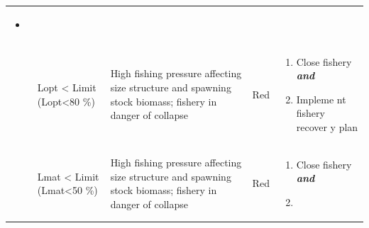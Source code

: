 \documentclass[]{book}
\begin{document}
\begin{longtable}[]{@{}lllll@{}}
\begin{minipage}[t]{0.19\columnwidth}
\begin{itemize}
\item
\end{itemize}\strut
\end{minipage}\tabularnewline
\begin{minipage}[t]{0.19\columnwidth}\raggedright\strut
\strut
\end{minipage} & \begin{minipage}[t]{0.19\columnwidth}\raggedright\strut
Lopt \textless{} Limit (Lopt\textless{}80 \%)\strut
\end{minipage} & \begin{minipage}[t]{0.19\columnwidth}\raggedright\strut
High fishing pressure affecting size structure and spawning stock
biomass; fishery in danger of collapse\strut
\end{minipage} & \begin{minipage}[t]{0.19\columnwidth}\raggedright\strut
Red\strut
\end{minipage} & \begin{minipage}[t]{0.19\columnwidth}\raggedright\strut
\begin{enumerate}
\def\labelenumi{\arabic{enumi}.}
\item
  Close fishery \textbf{\emph{and} }
\item
  Impleme nt fishery recover y plan
\end{enumerate}\strut
\end{minipage}\tabularnewline
\begin{minipage}[t]{0.19\columnwidth}\raggedright\strut
\strut
\end{minipage} & \begin{minipage}[t]{0.19\columnwidth}\raggedright\strut
Lmat \textless{} Limit (Lmat\textless{}50 \%)\strut
\end{minipage} & \begin{minipage}[t]{0.19\columnwidth}\raggedright\strut
High fishing pressure affecting size structure and spawning stock
biomass; fishery in danger of collapse\strut
\end{minipage} & \begin{minipage}[t]{0.19\columnwidth}\raggedright\strut
Red\strut
\end{minipage} & \begin{minipage}[t]{0.19\columnwidth}\raggedright\strut
\begin{enumerate}
\def\labelenumi{\arabic{enumi}.}
\item
  Close fishery \textbf{\emph{and} }
\item

\end{enumerate}
\end{minipage}
\end{longtable}
\end{document}
